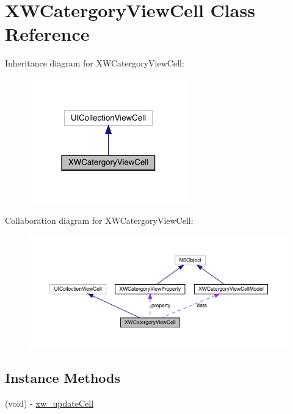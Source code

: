 \hypertarget{interface_x_w_catergory_view_cell}{}\section{X\+W\+Catergory\+View\+Cell Class Reference}
\label{interface_x_w_catergory_view_cell}


Inheritance diagram for X\+W\+Catergory\+View\+Cell\+:\nopagebreak
\begin{figure}[H]
\begin{center}
\leavevmode
\includegraphics[width=195pt]{interface_x_w_catergory_view_cell__inherit__graph}
\end{center}
\end{figure}


Collaboration diagram for X\+W\+Catergory\+View\+Cell\+:\nopagebreak
\begin{figure}[H]
\begin{center}
\leavevmode
\includegraphics[width=350pt]{interface_x_w_catergory_view_cell__coll__graph}
\end{center}
\end{figure}
\subsection*{Instance Methods}
\begin{DoxyCompactItemize}
\item 
(void) -\/ \mbox{\hyperlink{interface_x_w_catergory_view_cell_abb8793d39d920fc0b8ac3e175fb8e508}{xw\+\_\+update\+Cell}}
\end{DoxyCompactItemize}
